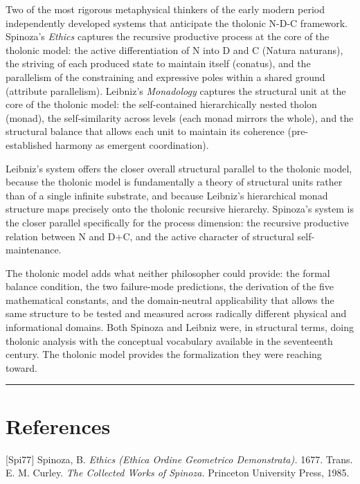 \documentclass[12pt]{article}
\begin{document}
Two of the most rigorous metaphysical thinkers of the early modern
period independently developed systems that anticipate the tholonic
N-D-C framework. Spinoza's \emph{Ethics} captures the recursive
productive process at the core of the tholonic model: the active
differentiation of N into D and C (Natura naturans), the striving of
each produced state to maintain itself (conatus), and the parallelism of
the constraining and expressive poles within a shared ground (attribute
parallelism). Leibniz's \emph{Monadology} captures the structural unit
at the core of the tholonic model: the self-contained hierarchically
nested tholon (monad), the self-similarity across levels (each monad
mirrors the whole), and the structural balance that allows each unit to
maintain its coherence (pre-established harmony as emergent
coordination).

Leibniz's system offers the closer overall structural parallel to the
tholonic model, because the tholonic model is fundamentally a theory of
structural units rather than of a single infinite substrate, and because
Leibniz's hierarchical monad structure maps precisely onto the tholonic
recursive hierarchy. Spinoza's system is the closer parallel
specifically for the process dimension: the recursive productive
relation between N and D+C, and the active character of structural
self-maintenance.

The tholonic model adds what neither philosopher could provide: the
formal balance condition, the two failure-mode predictions, the
derivation of the five mathematical constants, and the domain-neutral
applicability that allows the same structure to be tested and measured
across radically different physical and informational domains. Both
Spinoza and Leibniz were, in structural terms, doing tholonic analysis
with the conceptual vocabulary available in the seventeenth century. The
tholonic model provides the formalization they were reaching toward.

\begin{center}\rule{0.5\linewidth}{0.5pt}\end{center}

\section{References}\label{references}

{[}Spi77{]} Spinoza, B. \emph{Ethics (Ethica Ordine Geometrico
Demonstrata).} 1677. Trans. E. M. Curley. \emph{The Collected Works of
Spinoza.} Princeton University Press, 1985.
\end{document}

